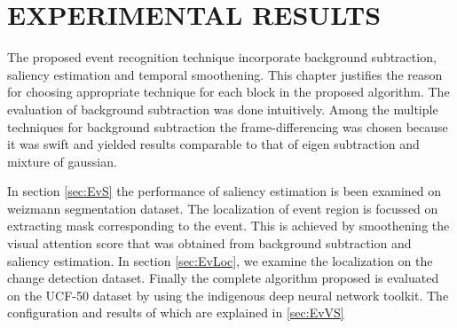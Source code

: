 \chapter{EXPERIMENTAL RESULTS}
\label{chap:exp}
The proposed event recognition technique incorporate background subtraction, saliency estimation and temporal smoothening.  This chapter justifies the reason for choosing appropriate technique for each block in the proposed algorithm.  The evaluation of background subtraction was done intuitively.  Among the multiple techniques for background subtraction the frame-differencing was chosen because it was swift and yielded results comparable to that of eigen subtraction and mixture of gaussian.
\par In section \ref{sec:EvS} the performance of saliency estimation is been examined on  weizmann segmentation dataset.  The localization of event region is focussed on extracting mask corresponding to the event.  This is achieved by smoothening the  visual attention score that was obtained from background subtraction and saliency estimation.  In section \ref{sec:EvLoc}, we examine the localization on the change detection dataset.  
Finally the complete algorithm proposed is evaluated on the UCF-50 dataset by using the indigenous deep neural network toolkit.  The configuration and results of which are explained in \ref{sec:EvVS}

